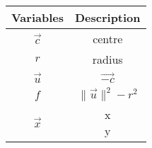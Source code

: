 \begin{tabular}[12pt]{ |c| c|}
    \hline
    \textbf{Variables} & \textbf{Description}\\ 
    \hline
    $\vec{c}$ & centre \\
    \hline
    $r$ & radius \\
    \hline
    $\vec{u}$ & $\vec{-c}$ \\
    \hline
    $f$ & $\lVert\vec{u}\rVert^2 - r^2$ \\
    \hline
 $\vec{x}$ & \myvec{x \\ y} \\
    \hline
\end{tabular}

